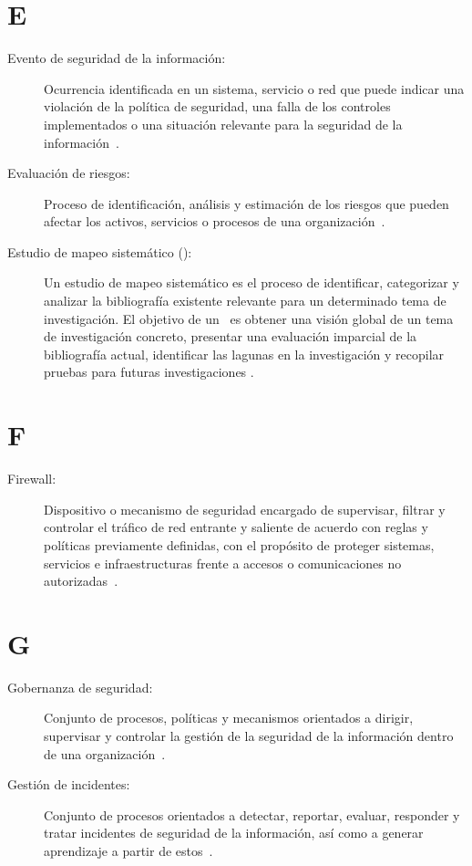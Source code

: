 \section*{E}
\begin{description}
	\item[Evento de seguridad de la información:] Ocurrencia identificada en un sistema, servicio o red que puede indicar una violación de la política de seguridad, una falla de los controles implementados o una situación relevante para la seguridad de la información~\cite{ISO27000Glossary}.
	
	\item[Evaluación de riesgos:] Proceso de identificación, análisis y estimación de los riesgos que pueden afectar los activos, servicios o procesos de una organización~\cite{ISO27000Glossary}.
	
	\item[Estudio de mapeo sistemático (\SMS):] Un estudio de mapeo sistemático es el proceso de identificar, categorizar y analizar la bibliografía existente relevante para un determinado tema de investigación. El objetivo de un \SMS~es obtener una visión global de un tema de investigación concreto, presentar una evaluación imparcial de la bibliografía actual, identificar las lagunas en la investigación y recopilar pruebas para futuras investigaciones \citep{Salama2017}.
\end{description}

\section*{F}
\begin{description}
	\item[Firewall:]  Dispositivo o mecanismo de seguridad encargado de supervisar, filtrar y controlar el tráfico de red entrante y saliente de acuerdo con reglas y políticas previamente definidas, con el propósito de proteger sistemas, servicios e infraestructuras frente a accesos o comunicaciones no autorizadas~\cite{NISTFirewall}.
\end{description}


\section*{G}
\begin{description}
	\item[Gobernanza de seguridad:] Conjunto de procesos, políticas y mecanismos orientados a dirigir, supervisar y controlar la gestión de la seguridad de la información dentro de una organización~\cite{MicrosoftSecurityGovernance}.
	
	\item[Gestión de incidentes:] Conjunto de procesos orientados a detectar, reportar, evaluar, responder y tratar incidentes de seguridad de la información, así como a generar aprendizaje a partir de estos~\cite{ISO27000Glossary}.
\end{description}

